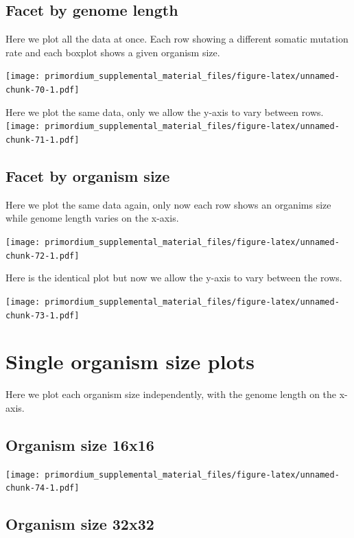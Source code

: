\documentclass[]{book}
\begin{document}
\hypertarget{facet-by-genome-length}{%
\subsection{Facet by genome length}\label{facet-by-genome-length}}

Here we plot all the data at once.
Each row showing a different somatic mutation rate and each boxplot shows a given organism size.

\texttt{[image: primordium\_supplemental\_material\_files/figure-latex/unnamed-chunk-70-1.pdf]}

Here we plot the same data, only we allow the y-axis to vary between rows.
\texttt{[image: primordium\_supplemental\_material\_files/figure-latex/unnamed-chunk-71-1.pdf]}

\hypertarget{facet-by-organism-size-2}{%
\subsection{Facet by organism size}\label{facet-by-organism-size-2}}

Here we plot the same data again, only now each row shows an organims size while genome length varies on the x-axis.

\texttt{[image: primordium\_supplemental\_material\_files/figure-latex/unnamed-chunk-72-1.pdf]}

Here is the identical plot but now we allow the y-axis to vary between the rows.

\texttt{[image: primordium\_supplemental\_material\_files/figure-latex/unnamed-chunk-73-1.pdf]}

\hypertarget{single-organism-size-plots-3}{%
\section{Single organism size plots}\label{single-organism-size-plots-3}}

Here we plot each organism size independently, with the genome length on the x-axis.

\hypertarget{organism-size-16x16-2}{%
\subsection{Organism size 16x16}\label{organism-size-16x16-2}}

\texttt{[image: primordium\_supplemental\_material\_files/figure-latex/unnamed-chunk-74-1.pdf]}

\hypertarget{organism-size-32x32-2}{%
\subsection{Organism size 32x32}\label{organism-size-32x32-2}}
\end{document}
